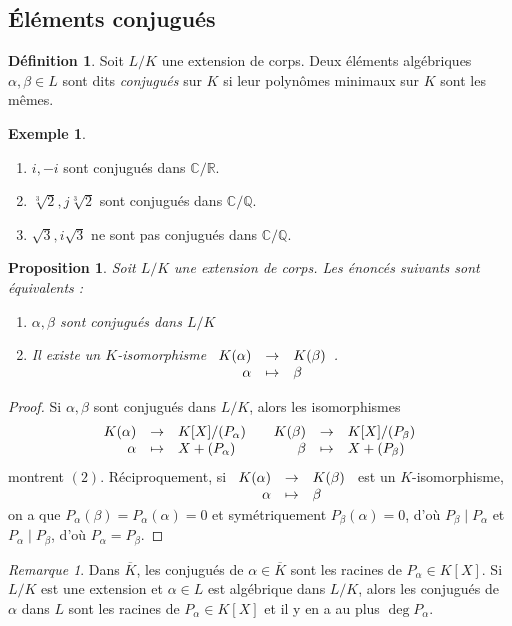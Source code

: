 \documentclass{article}
\newcommand{\Q}{\mathbb{Q}}
\newcommand{\R}{\mathbb{R}}
\newcommand{\C}{\mathbb{C}}
\newcommand{\applic}[4]{\begin{array}[t]{rcl}
#1 & \to & #2 \\
#3 & \mapsto & #4
\end{array}}
\theoremstyle{plain}
\newtheorem{proposition}[theorem]{Proposition}
\theoremstyle{definition}
\newtheorem{definition}[theorem]{Définition}
\newtheorem{example}[theorem]{Exemple}
\theoremstyle{remark}
\newtheorem*{remark}{Remarque}
\begin{document}
\subsection{Éléments conjugués}

\begin{definition}
    Soit $L/K$ une extension de corps. Deux éléments algébriques $\alpha,\beta \in L$ sont dits \emph{conjugués} sur $K$ si leur polynômes minimaux sur $K$ sont les mêmes.
\end{definition}

\begin{example} \leavevmode
    \begin{enumerate}
        \item $i,-i$ sont conjugués dans $\C/\R$.
        \item $\sqrt[3]{2},j\sqrt[3]{2}$ sont conjugués dans $\C/\Q$.
        \item $\sqrt{3},i\sqrt{3}$ ne sont pas conjugués dans $\C/\Q$.
    \end{enumerate}
\end{example}

\begin{proposition}
    Soit $L/K$ une extension de corps. Les énoncés suivants sont équivalents :
    \begin{enumerate}
        \item $\alpha,\beta$ sont conjugués dans $L/K$
        \item Il existe un $K$-isomorphisme $\applic{K(\alpha)}{K(\beta)}{\alpha}{\beta}$.
    \end{enumerate}
\end{proposition}

\begin{proof}
    Si $\alpha,\beta$ sont conjugués dans $L/K$, alors les isomorphismes
    \[\applic{K(\alpha)}{K[X]/(P_\alpha)}{\alpha}{X + (P_\alpha)}\quad\applic{K(\beta)}{K[X]/(P_\beta)}{\beta}{X + (P_\beta)}\]
    montrent $(2)$. Réciproquement, si $\applic{K(\alpha)}{K(\beta)}{\alpha}{\beta}$ est un $K$-isomorphisme, on a que $P_\alpha(\beta) = P_\alpha(\alpha) = 0$ et symétriquement $P_\beta(\alpha) = 0$, d'où $P_\beta \mid P_\alpha$ et $P_\alpha \mid P_\beta$, d'où $P_\alpha = P_\beta$.
\end{proof}

\begin{remark}
    Dans $\overline{K}$, les conjugués de $\alpha \in \overline{K}$ sont les racines de $P_\alpha \in K[X]$. Si $L/K$ est une extension et $\alpha \in L$ est algébrique dans $L/K$, alors les conjugués de $\alpha$ dans $L$ sont les racines de $P_\alpha \in K[X]$ et il y en a au plus $\deg P_\alpha$.
\end{remark}
\end{document}
